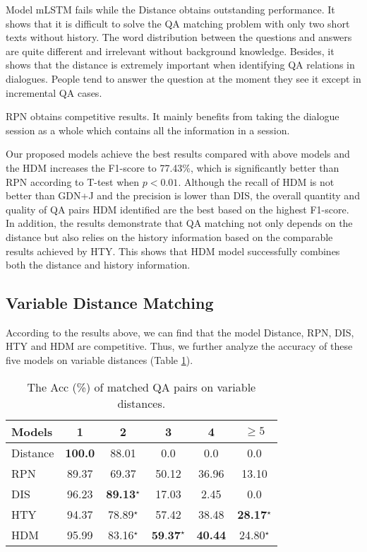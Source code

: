 Model mLSTM fails while the Distance obtains outstanding performance. It shows that it is difficult to solve the QA matching problem with only two short texts without history. The word distribution between the questions and answers are quite different and irrelevant without background knowledge. Besides, it shows that the distance is extremely important when identifying QA relations in dialogues. People tend to answer the question at the moment they see it except in incremental QA cases.

 RPN obtains competitive results. It mainly benefits from taking the dialogue session as a whole which contains all the information in a session. 
 
 Our proposed models achieve the best results compared with above models and 
the HDM increases the F1-score to 77.43\%, 
which is significantly better than RPN according to T-test when $p<0.01$. 
Although the recall of HDM is not better than GDN+J and the precision is 
lower than DIS, the overall quantity and quality of QA pairs HDM identified 
are the best based on the highest F1-score. 
In addition, the results demonstrate that QA matching not only depends on 
the distance but also relies on the history information based on 
the comparable results achieved by HTY. 
This shows that HDM model successfully combines both the distance and history 
information.


\subsection{Variable Distance Matching}

 According to the results above, we can find that the model Distance, RPN, DIS, HTY and HDM are competitive. Thus, we further analyze the accuracy of these five models on variable distances (Table \ref{tab:longrangeResults}).

\begin{table}[th]
	\small
	\centering
	\begin{tabular}{p{1.5cm}<{\centering}ccccc}
		\toprule[1.3pt]
		 Models &1&2&3&4&$\geq5$\\
		\midrule[1pt]
		Distance      &\textbf{100.0}&88.01&0.0&0.0&0.0 \\
		RPN  &89.37&69.37&50.12&36.96&13.10\\	
		DIS &96.23&\textbf{89.13}$^\star$&17.03&2.45&0.0\\
		HTY &94.37&78.89$^\star$&57.42&38.48&\textbf{28.17}$^\star$\\
		HDM &95.99&83.16$^\star$&$\textbf{59.37}^\star$&\textbf{40.44}&24.80$^\star$\\
		\bottomrule[1.3pt]
	\end{tabular}
	\caption{The Acc (\%) of matched QA pairs on variable distances.}
	\label{tab:longrangeResults}
\end{table}

